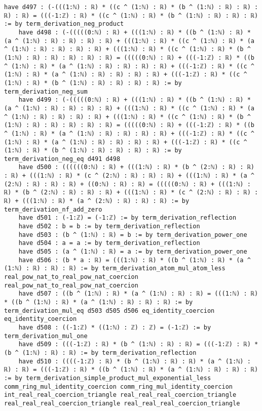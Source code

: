 \documentclass{article}
\begin{document}
\begin{tcolorbox}[colback=white!10, width=\linewidth]
\begin{lstlisting}[language=Lean4]
    have d497 : (-(((1:ℕ) : ℝ) * ((c ^ (1:ℕ) : ℝ) * (b ^ (1:ℕ) : ℝ) : ℝ) : ℝ) : ℝ) = (((-1:ℤ) : ℝ) * ((c ^ (1:ℕ) : ℝ) * (b ^ (1:ℕ) : ℝ) : ℝ) : ℝ) := by term_derivation_neg_product
    have d498 : (-(((((0:ℕ) : ℝ) + (((1:ℕ) : ℝ) * ((b ^ (1:ℕ) : ℝ) * (a ^ (1:ℕ) : ℝ) : ℝ) : ℝ) : ℝ) + (((1:ℕ) : ℝ) * ((c ^ (1:ℕ) : ℝ) * (a ^ (1:ℕ) : ℝ) : ℝ) : ℝ) : ℝ) + (((1:ℕ) : ℝ) * ((c ^ (1:ℕ) : ℝ) * (b ^ (1:ℕ) : ℝ) : ℝ) : ℝ) : ℝ) : ℝ) = (((((0:ℕ) : ℝ) + (((-1:ℤ) : ℝ) * ((b ^ (1:ℕ) : ℝ) * (a ^ (1:ℕ) : ℝ) : ℝ) : ℝ) : ℝ) + (((-1:ℤ) : ℝ) * ((c ^ (1:ℕ) : ℝ) * (a ^ (1:ℕ) : ℝ) : ℝ) : ℝ) : ℝ) + (((-1:ℤ) : ℝ) * ((c ^ (1:ℕ) : ℝ) * (b ^ (1:ℕ) : ℝ) : ℝ) : ℝ) : ℝ) := by term_derivation_neg_sum
    have d499 : (-(((((0:ℕ) : ℝ) + (((1:ℕ) : ℝ) * ((b ^ (1:ℕ) : ℝ) * (a ^ (1:ℕ) : ℝ) : ℝ) : ℝ) : ℝ) + (((1:ℕ) : ℝ) * ((c ^ (1:ℕ) : ℝ) * (a ^ (1:ℕ) : ℝ) : ℝ) : ℝ) : ℝ) + (((1:ℕ) : ℝ) * ((c ^ (1:ℕ) : ℝ) * (b ^ (1:ℕ) : ℝ) : ℝ) : ℝ) : ℝ) : ℝ) = (((((0:ℕ) : ℝ) + (((-1:ℤ) : ℝ) * ((b ^ (1:ℕ) : ℝ) * (a ^ (1:ℕ) : ℝ) : ℝ) : ℝ) : ℝ) + (((-1:ℤ) : ℝ) * ((c ^ (1:ℕ) : ℝ) * (a ^ (1:ℕ) : ℝ) : ℝ) : ℝ) : ℝ) + (((-1:ℤ) : ℝ) * ((c ^ (1:ℕ) : ℝ) * (b ^ (1:ℕ) : ℝ) : ℝ) : ℝ) : ℝ) := by term_derivation_neg_eq d491 d498
    have d500 : ((((((0:ℕ) : ℝ) + (((1:ℕ) : ℝ) * (b ^ (2:ℕ) : ℝ) : ℝ) : ℝ) + (((1:ℕ) : ℝ) * (c ^ (2:ℕ) : ℝ) : ℝ) : ℝ) + (((1:ℕ) : ℝ) * (a ^ (2:ℕ) : ℝ) : ℝ) : ℝ) + ((0:ℕ) : ℝ) : ℝ) = (((((0:ℕ) : ℝ) + (((1:ℕ) : ℝ) * (b ^ (2:ℕ) : ℝ) : ℝ) : ℝ) + (((1:ℕ) : ℝ) * (c ^ (2:ℕ) : ℝ) : ℝ) : ℝ) + (((1:ℕ) : ℝ) * (a ^ (2:ℕ) : ℝ) : ℝ) : ℝ) := by term_derivation_nf_add_zero
    have d501 : (-1:ℤ) = (-1:ℤ) := by term_derivation_reflection
    have d502 : b = b := by term_derivation_reflection
    have d503 : (b ^ (1:ℕ) : ℝ) = b := by term_derivation_power_one
    have d504 : a = a := by term_derivation_reflection
    have d505 : (a ^ (1:ℕ) : ℝ) = a := by term_derivation_power_one
    have d506 : (b * a : ℝ) = (((1:ℕ) : ℝ) * ((b ^ (1:ℕ) : ℝ) * (a ^ (1:ℕ) : ℝ) : ℝ) : ℝ) := by term_derivation_atom_mul_atom_less real_pow_nat_to_real_pow_nat_coercion real_pow_nat_to_real_pow_nat_coercion
    have d507 : ((b ^ (1:ℕ) : ℝ) * (a ^ (1:ℕ) : ℝ) : ℝ) = (((1:ℕ) : ℝ) * ((b ^ (1:ℕ) : ℝ) * (a ^ (1:ℕ) : ℝ) : ℝ) : ℝ) := by term_derivation_mul_eq d503 d505 d506 eq_identity_coercion eq_identity_coercion
    have d508 : ((-1:ℤ) * ((1:ℕ) : ℤ) : ℤ) = (-1:ℤ) := by term_derivation_mul_one
    have d509 : (((-1:ℤ) : ℝ) * (b ^ (1:ℕ) : ℝ) : ℝ) = (((-1:ℤ) : ℝ) * (b ^ (1:ℕ) : ℝ) : ℝ) := by term_derivation_reflection
    have d510 : ((((-1:ℤ) : ℝ) * (b ^ (1:ℕ) : ℝ) : ℝ) * (a ^ (1:ℕ) : ℝ) : ℝ) = (((-1:ℤ) : ℝ) * ((b ^ (1:ℕ) : ℝ) * (a ^ (1:ℕ) : ℝ) : ℝ) : ℝ) := by term_derivation_simple_product_mul_exponential_less comm_ring_mul_identity_coercion comm_ring_mul_identity_coercion int_real_real_coercion_triangle real_real_real_coercion_triangle real_real_real_coercion_triangle real_real_real_coercion_triangle

\end{lstlisting}
\end{tcolorbox}
\end{document}
